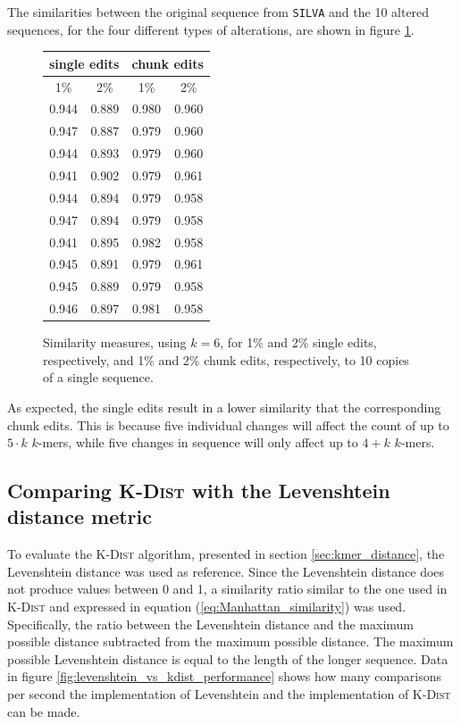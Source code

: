 The similarities between the original sequence from \texttt{SILVA} and the 10
altered sequences, for the four different types of alterations, are shown in
figure \ref{fig:altered_seqs_similarities}.

\begin{figure}[H]
  \centering
  \begin{tabular}{c|c||c|c}
    \multicolumn{2}{c||}{single edits}  & \multicolumn{2}{c}{chunk edits} \\
    \hline\hline
    1\%   &   2\%                   &   1\%   &   2\% \\
    \hline
    0.944   & 0.889                     & 0.980     & 0.960 \\
    0.947   & 0.887                     & 0.979     & 0.960 \\
    0.944   & 0.893                     & 0.979     & 0.960 \\
    0.941   & 0.902                     & 0.979     & 0.961 \\
    0.944   & 0.894                     & 0.979     & 0.958 \\
    0.947   & 0.894                     & 0.979     & 0.958 \\
    0.941   & 0.895                     & 0.982     & 0.958 \\
    0.945   & 0.891                     & 0.979     & 0.961 \\
    0.945   & 0.889                     & 0.979     & 0.958 \\
    0.946   & 0.897                     & 0.981     & 0.958
  \end{tabular}
  \caption{Similarity measures, using $k=6$, for 1\% and 2\% single edits, respectively,
    and 1\% and 2\% chunk edits, respectively, to 10 copies of a single
    sequence.}
  \label{fig:altered_seqs_similarities}
\end{figure}

As expected, the single edits result in a lower similarity that the
corresponding chunk edits. This is because five individual changes will affect
the count of up to $5 \cdot k$ $k$-mers, while five changes in sequence will
only affect up to $4+k$ $k$-mers.


\subsection{Comparing \textsc{K-Dist} with the Levenshtein distance metric}

To evaluate the \textsc{K-Dist} algorithm, presented in section
\ref{sec:kmer_distance}, the Levenshtein distance was used as reference. Since
the Levenshtein distance does not produce values between 0 and 1, a similarity
ratio similar to the one used in \textsc{K-Dist} and expressed in equation
(\ref{eq:Manhattan_similarity}) was used. Specifically, the ratio between the
Levenshtein distance and the maximum possible distance subtracted from the
maximum possible distance. The maximum possible Levenshtein distance is equal
to the length of the longer sequence. Data in figure
\ref{fig:levenshtein_vs_kdist_performance} shows how many comparisons per
second the implementation of Levenshtein and the implementation of
\textsc{K-Dist} can be made.


